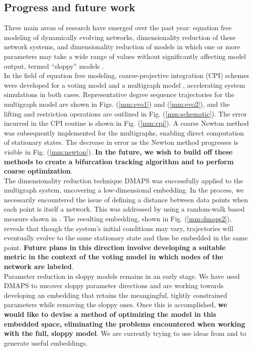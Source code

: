 \documentclass[12pt]{article}
\begin{document}
\begin{spacing}{2}
\section*{Progress and future work}
\indent Three main areas of research have emerged over the past year: equation free modeling of dynamically evolving networks, dimensionality reduction of these network systems, and dimensionality reduction of models in which one or more parameters may take a wide range of values without significantly affecting model output, termed ``sloppy'' models \cite{Gutenkunst2007}. \\
\indent In the field of equation free modeling, coarse-projective integration (CPI) schemes were developed for a voting model and a multigraph model \cite{Rath2012} \cite{Durrett2012}, accelerating system simulations in both cases. Representative degree sequence trajectories for the multigraph model are shown in Figs. (\ref{mm:evo1}) and (\ref{mm:evo2}), and the lifting and restriction operations are outlined in Fig. (\ref{mm:schematic}). The error incurred in the CPI routine is shown in Fig. (\ref{mm:cpi}). A coarse Newton method was subsequently implemented for the multigraphs, enabling direct computation of stationary states. The decrease in error as the Newton method progresses is visible in Fig. (\ref{mm:newton}). \textbf{In the future, we wish to build off these methods to create a bifurcation tracking algorithm and to perform coarse optimization}. \\
\indent The dimensionality reduction technique DMAPS was successfully applied to the multigraph system, uncovering a low-dimensional embedding. In the process, we necessarily encountered the issue of defining a distance between data points when each point is itself a network. This was addressed by using a random-walk based measure shown in \cite{Rajendran2013}. The resulting embedding, shown in Fig. (\ref{mm:dmaps2}), reveals that though the system's initial conditions may vary, trajectories will eventually evolve to the same stationary state and thus be embedded in the same point. \textbf{Future plans in this direction involve developing a suitable metric in the context of the voting model in which nodes of the network are labeled}. \\
\indent Parameter reduction in sloppy models remains in an early stage. We have used DMAPS to uncover sloppy parameter directions and are working towards developing an embedding that retains the meangingful, tightly constrained parameters while removing the sloppy ones. Once this is accomplished, \textbf{we would like to devise a method of optimizing the model in this embedded space, eliminating the problems encountered when working with the full, sloppy model}. We are currently trying to use ideas from \cite{Dsilva} and \cite{Lafon2004} to generate useful embeddings. \\

\end{spacing}
\end{document}
